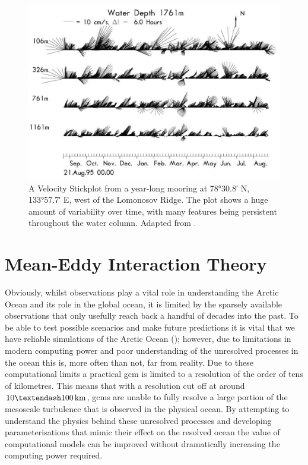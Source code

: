 \documentclass[12pt,a4paper]{report}
\begin{document}
\begin{figure}
	\centering
	\includegraphics[width=\linewidth]{Woodgate2001Mooring}
	\caption[Adapted from \cite{woodgate2001arctic}]{A Velocity Stickplot 
		from a year-long mooring at \ang{78;30.8;} N, \ang{133;57.7;} E, west of the Lomonosov Ridge.  The plot shows a huge amount of variability over time, with many
		features being persistent throughout the water column. Adapted from \cite{woodgate2001arctic}.}
	\label{fig:Woodgate2001Mooring}
\end{figure}

\section{Mean-Eddy Interaction Theory}

\label{meaneddyinteractiontheory}

 Obviously, whilst observations play a vital role in understanding the Arctic
 Ocean and its role in the global ocean, it is limited by the sparsely available
 observations that only usefully reach back a handful of decades into the past.
 To be able to test possible scenarios and make future predictions it is vital
 that we have reliable simulations of the Arctic Ocean (\cite{proshutinsky2008toward});
 however, due to limitations
 in modern computing power and poor understanding of the unresolved processes 
 in the ocean this is, more often than not, far from reality.
 Due to these computational limits a practical \gls{gcm} is 
 limited to a  resolution of the order of tens of kilometres. This means that with a 
 resolution  cut off at around $10 \textendash 100 \, \mathrm{km}$, 
 \glspl{gcm} are unable to fully resolve a large portion of the mesoscale turbulence that is
 observed in the physical ocean.
 By attempting  to understand the physics behind these unresolved processes 
 and developing parameterisations that mimic their effect on the resolved ocean
 the value of computational models can be improved without dramatically increasing the
 computing power required.  
 
\end{document}
